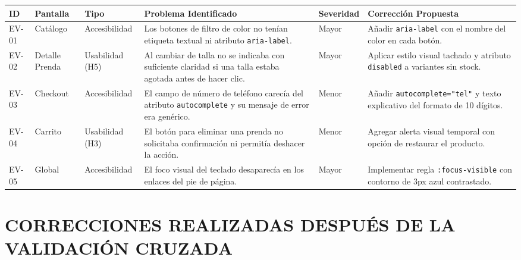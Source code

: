 \documentclass[12pt]{article}
\begin{document}
\begin{table}[H]
\centering
\small
\renewcommand{\arraystretch}{1.3}
\begin{tabularx}{\textwidth}{|p{1.2cm}|p{2cm}|p{2cm}|X|p{1.6cm}|p{2.8cm}|}
\hline
\textbf{ID} & \textbf{Pantalla} & \textbf{Tipo} & \textbf{Problema Identificado} & \textbf{Severidad} & \textbf{Corrección Propuesta} \\ \hline
EV-01 & Catálogo & Accesibilidad & Los botones de filtro de color no tenían etiqueta textual ni atributo \texttt{aria-label}. & Mayor & Añadir \texttt{aria-label} con el nombre del color en cada botón. \\ \hline
EV-02 & Detalle Prenda & Usabilidad (H5) & Al cambiar de talla no se indicaba con suficiente claridad si una talla estaba agotada antes de hacer clic. & Mayor & Aplicar estilo visual tachado y atributo \texttt{disabled} a variantes sin stock. \\ \hline
EV-03 & Checkout & Accesibilidad & El campo de número de teléfono carecía del atributo \texttt{autocomplete} y su mensaje de error era genérico. & Menor & Añadir \texttt{autocomplete="tel"} y texto explicativo del formato de 10 dígitos. \\ \hline
EV-04 & Carrito & Usabilidad (H3) & El botón para eliminar una prenda no solicitaba confirmación ni permitía deshacer la acción. & Menor & Agregar alerta visual temporal con opción de restaurar el producto. \\ \hline
EV-05 & Global & Accesibilidad & El foco visual del teclado desaparecía en los enlaces del pie de página. & Mayor & Implementar regla \texttt{:focus-visible} con contorno de 3px azul contrastado. \\ \hline
\end{tabularx}
\end{table}

\section*{CORRECCIONES REALIZADAS DESPUÉS DE LA VALIDACIÓN CRUZADA}
\end{document}
